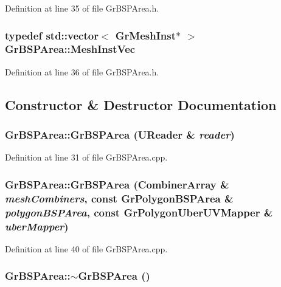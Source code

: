 Definition at line 35 of file GrBSPArea.h.\hypertarget{class_gr_b_s_p_area_ca3e4c6211c02064ec2d70b4f61738a8}{
\subsubsection[{MeshInstVec}]{\setlength{\rightskip}{0pt plus 5cm}typedef std::vector$<$ {\bf GrMeshInst}$\ast$ $>$ {\bf GrBSPArea::MeshInstVec}}}
\label{class_gr_b_s_p_area_ca3e4c6211c02064ec2d70b4f61738a8}




Definition at line 36 of file GrBSPArea.h.

\subsection{Constructor \& Destructor Documentation}
\hypertarget{class_gr_b_s_p_area_1917808ab54ae082c728ac4a7d227d51}{
\subsubsection[{GrBSPArea}]{\setlength{\rightskip}{0pt plus 5cm}GrBSPArea::GrBSPArea ({\bf UReader} \& {\em reader})}}
\label{class_gr_b_s_p_area_1917808ab54ae082c728ac4a7d227d51}




Definition at line 31 of file GrBSPArea.cpp.\hypertarget{class_gr_b_s_p_area_c3b18df6dd0993c841482ed39ebe78ee}{
\subsubsection[{GrBSPArea}]{\setlength{\rightskip}{0pt plus 5cm}GrBSPArea::GrBSPArea ({\bf CombinerArray} \& {\em meshCombiners}, \/  const {\bf GrPolygonBSPArea} \& {\em polygonBSPArea}, \/  const {\bf GrPolygonUberUVMapper} \& {\em uberMapper})}}
\label{class_gr_b_s_p_area_c3b18df6dd0993c841482ed39ebe78ee}




Definition at line 40 of file GrBSPArea.cpp.\hypertarget{class_gr_b_s_p_area_89f1cd22f5fcfd2fad44188428bcddd2}{
\subsubsection[{$\sim$GrBSPArea}]{\setlength{\rightskip}{0pt plus 5cm}GrBSPArea::$\sim$GrBSPArea ()}}
\label{class_gr_b_s_p_area_89f1cd22f5fcfd2fad44188428bcddd2}




